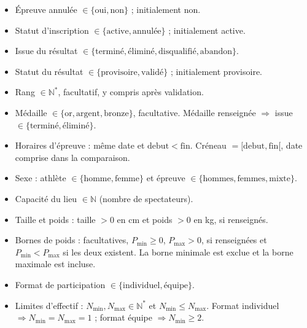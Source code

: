 \begin{itemize}[itemsep=0.5\baselineskip]
  \item Épreuve annulée \(\in\{\mbox{oui},\mbox{non}\}\) ; initialement non.
  \item Statut d'inscription \(\in\{\mbox{active},\mbox{annulée}\}\) ; initialement active.
  \item Issue du résultat \(\in\{\mbox{terminé},\mbox{éliminé},\mbox{disqualifié},\mbox{abandon}\}\).
  \item Statut du résultat \(\in\{\mbox{provisoire},\mbox{validé}\}\) ; initialement provisoire.
  \item Rang \(\in \mathbb{N}^{*}\), facultatif, y compris après validation.
  \item Médaille \(\in\{\mbox{or},\mbox{argent},\mbox{bronze}\}\), facultative.\newline
  Médaille renseignée \(\Longrightarrow\) issue \(\in\{\mbox{terminé},\mbox{éliminé}\}\).
  \item Horaires d'épreuve : même date et \(\mathrm{debut}<\mathrm{fin}\).\newline
  Créneau \(=[\mathrm{debut},\mathrm{fin}[\), date comprise dans la comparaison.
  \item Sexe : athlète \(\in\{\mbox{homme},\mbox{femme}\}\) et épreuve \(\in\{\mbox{hommes},\mbox{femmes},\mbox{mixte}\}\).
  \item Capacité du lieu \(\in \mathbb{N}\) (nombre de spectateurs).
  \item Taille et poids : taille \(>0\) en cm et poids \(>0\) en kg, si renseignés.
  \item Bornes de poids : facultatives, \(P_{\min}\geq 0\), \(P_{\max}>0\), si renseignées et \(P_{\min}<P_{\max}\) si les deux existent. La borne minimale est exclue et la borne maximale est incluse.
  \item Format de participation \(\in\{\mbox{individuel},\mbox{équipe}\}\).
  \item Limites d'effectif : \(N_{\min},N_{\max}\in \mathbb{N}^{*}\) et \(N_{\min}\leq N_{\max}\).\newline
  Format individuel \(\Longrightarrow N_{\min}=N_{\max}=1\) ; format équipe \(\Longrightarrow N_{\min}\geq 2\).
\end{itemize}


